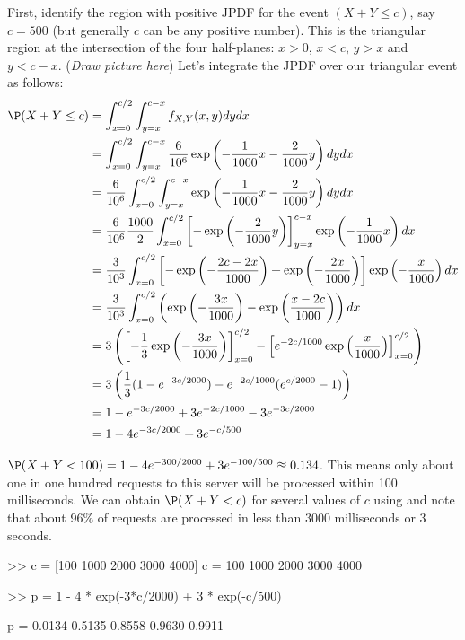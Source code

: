 \begin{example}
{}
\item
First, identify the region with positive JPDF for the event $(X+Y \leq c)$, say $c=500$ (but generally $c$ can be any positive number).
This is the triangular region at the intersection of the four half-planes: $x>0$, $x < c$, $y>x$ and $y<c-x$. ({\em Draw picture here})
Let's integrate the JPDF over our triangular event as follows:
{\scriptsize
\begin{align*}
\P(X+Y \leq c) 
&= \int_{x=0}^{c/2}\int_{y=x}^{c-x} f_{X,Y}(x,y) dy dx \\
&= \int_{x=0}^{c/2}\int_{y=x}^{c-x} \frac{6}{10^6} \exp \left( -\frac{1}{1000}x-\frac{2}{1000}y \right) dy dx \\
&= \frac{6}{10^6} \int_{x=0}^{c/2}\int_{y=x}^{c-x}  \exp \left( -\frac{1}{1000}x-\frac{2}{1000}y \right) dy dx \\
&= \frac{6}{10^6} \frac{1000}{2} \int_{x=0}^{c/2} \left[ - \exp \left( -\frac{2}{1000}y \right) \right]_{y=x}^{c-x}  \exp \left(-\frac{1}{1000}x\right) dx\\
&= \frac{3}{10^3} \int_{x=0}^{c/2} \left[ - \exp \left( -\frac{2c-2x}{1000} \right) + \exp \left( -\frac{2x}{1000} \right) \right]  \exp \left(-\frac{x}{1000}\right) dx\\
&= \frac{3}{10^3} \int_{x=0}^{c/2} \left(  \exp \left( -\frac{3x}{1000} \right) - \exp \left( \frac{x-2c}{1000} \right) \right)  dx\\
&= 3 \left( \left[-\frac{1}{3} \exp \left( -\frac{3x}{1000} \right) \right]_{x=0}^{c/2} - \left[ e^{-2c/1000} \exp \left( \frac{x}{1000} \right)\right]_{x=0}^{c/2} \right)  \\
&= 3  \left(\frac{1}{3} (1-e^{-3c/2000}) - e^{-2c/1000} (e^{c/2000}-1) \right)\\
&= 1 - e^{-3c/2000} + 3 e^{-2c/1000} - 3 e^{-3c/2000}\\
&= 1 - 4 e^{-3c/2000} + 3 e^{-c/500}
\end{align*}
}
\item $\P(X+Y<100) = 1 - 4 e^{-300/2000} + 3 e^{-100/500} \approxeq 0.134$.  This means only about one in one hundred requests to this server will be processed within 100 milliseconds.
\ee
We can obtain $\P(X+Y<c)$ for several values of $c$ using \Matlab and note that about 96\% of requests are processed in less than 3000 milliseconds or 3 seconds.
\begin{VrbM}
>> c = [100 1000 2000 3000 4000]
c =  100        1000        2000        3000        4000

>> p = 1 - 4 * exp(-3*c/2000) + 3 * exp(-c/500)

p =  0.0134     0.5135      0.8558      0.9630      0.9911
\end{VrbM}
\end{example}

